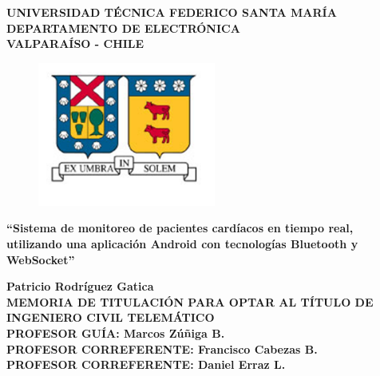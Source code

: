 \documentclass[12pt,spanish]{thesis}
\begin{document}
\thispagestyle{empty}

\begin{center}
\renewcommand{\baselinestretch}{1.15}
\textbf{\large{UNIVERSIDAD TÉCNICA FEDERICO SANTA MARÍA\\}
\normalsize{DEPARTAMENTO DE ELECTRÓNICA\\VALPARAÍSO - CHILE\\}}

\vspace{0.5cm}
\begin{figure}[H]
\centering
  \includegraphics[width=5.85cm]{figuras/usmLogo.png}
\end{figure}
\vspace{0.5cm}

\renewcommand{\baselinestretch}{1}
\hangindent=0cm
\textbf{\Large ``Sistema de monitoreo de pacientes cardíacos en tiempo real, utilizando una aplicación Android con tecnologías Bluetooth y WebSocket''\\}
\vspace{3cm}

\hangindent=0cm\large \textbf{Patricio Rodríguez Gatica}\\
\vspace{0.5cm}
\hangindent=0cm\normalsize \textbf{MEMORIA DE TITULACIÓN PARA OPTAR AL TÍTULO DE INGENIERO CIVIL TELEMÁTICO}\\

\vspace{1.5cm}
\hangindent=0cm\normalsize \textbf{PROFESOR GUÍA: \hspace{5cm} Marcos Zúñiga B.}\\

\vspace{0.5cm}
\hangindent=0cm\normalsize \textbf{PROFESOR CORREFERENTE: \hspace{2cm} Francisco Cabezas B.}\\

\vspace{0.5cm}
\hangindent=0cm\normalsize \textbf{PROFESOR CORREFERENTE: \hspace{3cm} Daniel Erraz L.}\\

\end{center}
\end{document}
